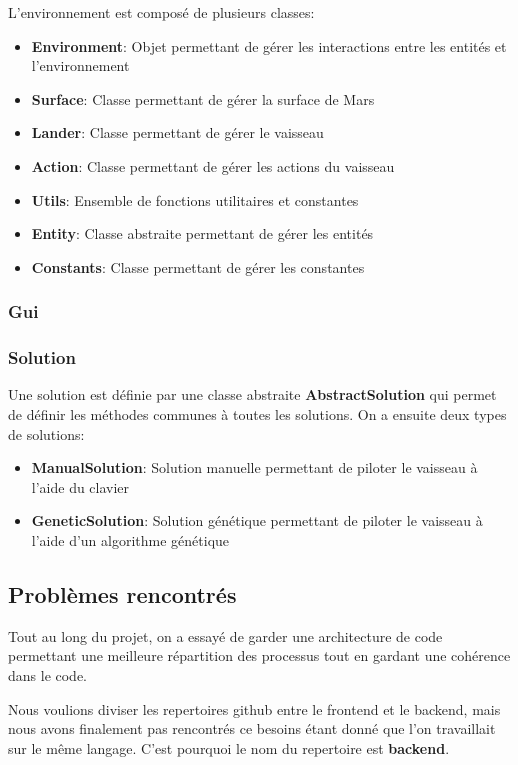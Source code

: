 \documentclass[french,a4paper,10pt,twocolumn]{article}
\begin{document}
L'environnement est composé de plusieurs classes:
\begin{itemize}
    \item \textbf{Environment}: Objet permettant de gérer les interactions entre les entités et l'environnement
    \item \textbf{Surface}: Classe permettant de gérer la surface de Mars
    \item \textbf{Lander}: Classe permettant de gérer le vaisseau
    \item \textbf{Action}: Classe permettant de gérer les actions du vaisseau
    \item \textbf{Utils}: Ensemble de fonctions utilitaires et constantes 
    \item \textbf{Entity}: Classe abstraite permettant de gérer les entités
    \item \textbf{Constants}: Classe permettant de gérer les constantes
\end{itemize}

\subsubsection{Gui}

\subsubsection{Solution}    

Une solution est définie par une classe abstraite \textbf{AbstractSolution} qui permet de définir les méthodes communes à toutes les solutions.
On a ensuite deux types de solutions:
\begin{itemize}
    \item \textbf{ManualSolution}: Solution manuelle permettant de piloter le vaisseau à l'aide du clavier
    \item \textbf{GeneticSolution}: Solution génétique permettant de piloter le vaisseau à l'aide d'un algorithme génétique
\end{itemize}

\subsection{Problèmes rencontrés}

Tout au long du projet, on a essayé de garder une architecture de code permettant une meilleure répartition des processus
tout en gardant une cohérence dans le code. 

Nous voulions diviser les repertoires github entre le frontend et le backend, mais nous avons finalement pas rencontrés ce besoins étant donné
que l'on travaillait sur le même langage. C'est pourquoi le nom du repertoire est \textbf{backend}.




\pagebreak
\printbibliography
\end{document}

